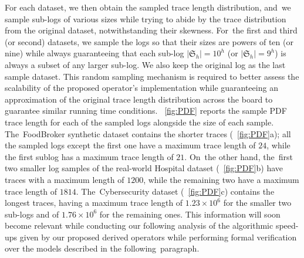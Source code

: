 \documentclass[information,article,accept,pdftex,oneauthor]{Definitions/mdpi}
\newcommand{\LOG}{\ensuremath{\mathfrak{S}}}
\begin{document}
For each dataset, we then obtain the sampled trace length distribution, and~we sample sub-logs of various sizes while trying to abide by the trace distribution from the original dataset, notwithstanding their skewness. For~the first and third (or second) datasets, we sample the logs so that their sizes are powers of ten (or nine) while always guaranteeing that each sub-log $|\LOG_h|=10^h$ (or $|\LOG_h|=9^h$) is always a subset of any larger sub-log. We also keep the original log as the last sample dataset. This random sampling mechanism is required to better assess the scalability of the proposed operator's implementation while guaranteeing an approximation of the original trace length distribution across the board to guarantee similar running time conditions. \figurename~\ref{fig:PDF} reports the sample PDF trace length for each of the sampled logs alongside the size of each sample. The~{FoodBroker} synthetic dataset contains the shorter traces (\figurename~\ref{fig:PDF}a); all the sampled logs except the first one have a maximum trace length of $24$, while the first sublog has a maximum trace length of $21$. On~the other hand, the~first two smaller log samples of the real-world {Hospital} dataset (\figurename~\ref{fig:PDF}b) have traces with a maximum length of $1200$, while the remaining two have a maximum trace length of $1814$. The~{Cybersecurity} dataset (\figurename ~\ref{fig:PDF}c) contains the longest traces, having a maximum trace length of {$1.23\times10^6$} %
 for the smaller two sub-logs and of {$1.76\times 10^6$} for the remaining ones. This information will soon become relevant while conducting our following analysis of the algorithmic speed-ups given by our proposed derived operators while performing formal verification over the models described in the following~paragraph.
\end{document}
